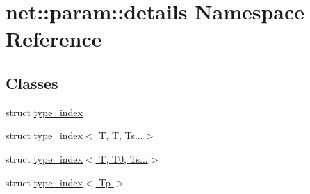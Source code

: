 \hypertarget{namespacenet_1_1param_1_1details}{\section{net\-:\-:param\-:\-:details Namespace Reference}
\label{namespacenet_1_1param_1_1details}
}
\subsection*{Classes}
\begin{DoxyCompactItemize}
\item 
struct \hyperlink{structnet_1_1param_1_1details_1_1type__index}{type\-\_\-index}
\item 
struct \hyperlink{structnet_1_1param_1_1details_1_1type__index_3_01T_00_01T_00_01Ts_8_8_8_4}{type\-\_\-index$<$ T, T, Ts...$>$}
\item 
struct \hyperlink{structnet_1_1param_1_1details_1_1type__index_3_01T_00_01T0_00_01Ts_8_8_8_4}{type\-\_\-index$<$ T, T0, Ts...$>$}
\item 
struct \hyperlink{structnet_1_1param_1_1details_1_1type__index_3_01Tp_01_4}{type\-\_\-index$<$ Tp $>$}
\end{DoxyCompactItemize}
